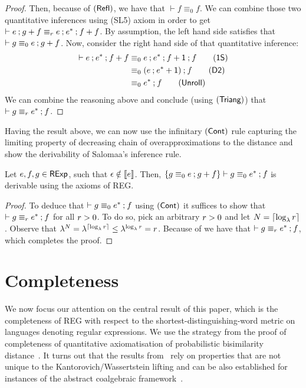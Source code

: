 \begin{proof}
		
		Then, because of $(\textsf{Refl})$, we have that $\vdash f \equiv_0 f$. We can combine those two quantitative inferences using \textsf{(SL5)} axiom in order to get $\vdash e \mathbin{;} g + f \equiv_{r} e \mathbin{;} e^\ast \mathbin{;} f  + f $. By assumption, the left hand side satisfies that $\vdash g \equiv_0 e \mathbin{;} g + f$. Now, consider the right hand side of that quantitative inference:
	\begin{align*}
		\vdash e \seq e^{\ast} \seq f + f &\equiv_0 e \seq e^\ast \seq f + \one \seq f \tag{\textsf{1S}} \\
		&\equiv_0 (e \seq e^* + \one) \seq f \tag{\textsf{D2}} \\
		&\equiv_0 e^{*} \seq f \tag{\textsf{Unroll}}
	\end{align*}
	We can combine the reasoning above and conclude (using $(\textsf{Triang})$) that $\vdash g \equiv_{r} e^\ast \mathbin{;} f$.
\end{proof}
Having the result above, we can now use the infinitary $(\textsf{Cont})$ rule capturing the limiting property of decreasing chain of overapproximations to the distance and show the derivability of Salomaa's inference rule.
\begin{lemma}
	Let $e,f,g \in \mathsf{RExp}$, such that $\epsilon \notin \left\llbracket{e}\right\rrbracket$. Then, $\{g \equiv_0 e \mathbin{;} g + f\} \vdash g \equiv_{0} e^{\ast} \mathbin{;} f$ is derivable using the axioms of \textsf{REG}.

\end{lemma}
\begin{proof}
To deduce that $\vdash g \equiv_0 e^{\ast} \mathbin{;} f$ using $(\textsf{Cont})$ it suffices to show that $\vdash g \equiv_{r} e^{\ast} \mathbin{;} f$ for all $r > 0$.  To do so, pick an arbitrary $r > 0$ and let $N = \lceil \log_{\lambda} r \rceil$. Observe that $\lambda^N = \lambda^{\lceil \log_{\lambda} r \rceil} \leq \lambda^{\log_{\lambda} r} = r$. Because of  we have that $\vdash g \equiv_{r} e^{\ast} \mathbin{;} f$, which completes the proof.
\end{proof}
\section{Completeness}\label{c2:sec:completeness}
We now focus our attention on the central result of this paper, which is the completeness of \textsf{REG} with respect to the shortest-distinguishing-word metric on languages denoting regular expressions. We use the strategy from the proof of completeness of quantitative axiomatisation of probabilistic bisimilarity distance~\cite{Bacci:2018:Bisimilarity}. It turns out that the results from~\cite{Bacci:2018:Bisimilarity} rely on properties that are not unique to the Kantorovich/Wassertstein lifting and can be also established for instances of the abstract coalgebraic framework~\cite{Baldan:2018:Coalgebraic}.

